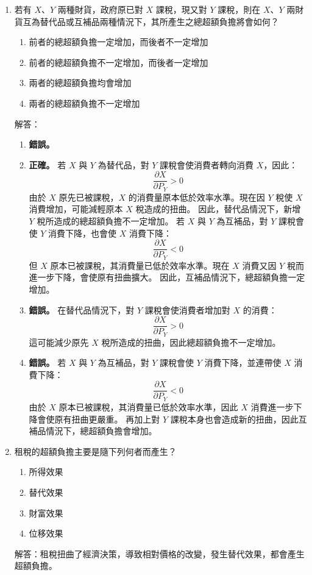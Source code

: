 \documentclass[12pt, a4paper]{article}
\begin{document}
\begin{enumerate}
    \item 若有 \(X\)、\(Y\) 兩種財貨，政府原已對 \(X\) 課稅，現又對 \(Y\) 課稅，則在 \(X\)、\(Y\) 兩財貨互為替代品或互補品兩種情況下，其所產生之總超額負擔將會如何？
    \begin{enumerate}[label=\Alph*.]
        \item 前者的總超額負擔一定增加，而後者不一定增加
        \item 前者的總超額負擔不一定增加，而後者一定增加
        \item 兩者的總超額負擔均會增加
        \item 兩者的總超額負擔不一定增加
    \end{enumerate}
    解答：
    \begin{enumerate}[label=\Alph*.]
    \item \textbf{錯誤。}
    \item \textbf{正確。}
    若 \(X\) 與 \(Y\) 為替代品，對 \(Y\) 課稅會使消費者轉向消費 \(X\)，因此：
    \[
    \frac{\partial X}{\partial P_Y} > 0
    \]
    由於 \(X\) 原先已被課稅，\(X\) 的消費量原本低於效率水準。現在因 \(Y\) 稅使 \(X\) 消費增加，可能減輕原本 \(X\) 稅造成的扭曲。
    因此，替代品情況下，新增 \(Y\) 稅所造成的總超額負擔不一定增加。
    若 \(X\) 與 \(Y\) 為互補品，對 \(Y\) 課稅會使 \(Y\) 消費下降，也會使 \(X\) 消費下降：
    \[
    \frac{\partial X}{\partial P_Y} < 0
    \]
    但 \(X\) 原本已被課稅，其消費量已低於效率水準。現在 \(X\) 消費又因 \(Y\) 稅而進一步下降，會使原有扭曲擴大。
    因此，互補品情況下，總超額負擔一定增加。
    \item \textbf{錯誤。}
    在替代品情況下，對 \(Y\) 課稅會使消費者增加對 \(X\) 的消費：
    \[
    \frac{\partial X}{\partial P_Y} > 0
    \]
    這可能減少原先 \(X\) 稅所造成的扭曲，因此總超額負擔不一定增加。
    \item \textbf{錯誤。}
    若 \(X\) 與 \(Y\) 為互補品，對 \(Y\) 課稅會使 \(Y\) 消費下降，並連帶使 \(X\) 消費下降：
    \[
    \frac{\partial X}{\partial P_Y} < 0
    \]
    由於 \(X\) 原本已被課稅，其消費量已低於效率水準，因此 \(X\) 消費進一步下降會使原有扭曲更嚴重。
    再加上對 \(Y\) 課稅本身也會造成新的扭曲，因此互補品情況下，總超額負擔會增加。
\end{enumerate}

    \item 租稅的超額負擔主要是隨下列何者而產生？
    \begin{enumerate}[label=\Alph*.]
        \item 所得效果
        \item 替代效果
        \item 財富效果
        \item 位移效果
    \end{enumerate}
    解答：租稅扭曲了經濟決策，導致相對價格的改變，發生替代效果，都會產生超額負擔。


\end{enumerate}
\end{document}
